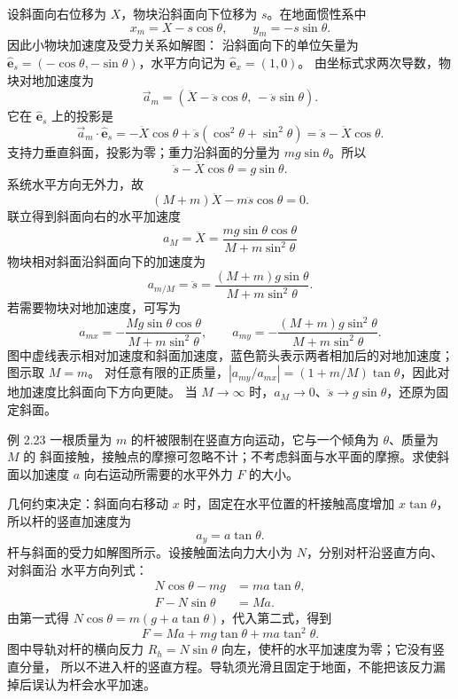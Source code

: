 \begin{xesolution}
设斜面向右位移为 $X$，物块沿斜面向下位移为 $s$。在地面惯性系中
\[
 x_m=X-s\cos\theta,
 \qquad
 y_m=-s\sin\theta.
\]
因此小物块加速度及受力关系如解图：
\soldiagTwoTwentyTwo
沿斜面向下的单位矢量为 $\hat{\boldsymbol e}_s=(-\cos\theta,-\sin\theta)$，水平方向记为 $\hat{\boldsymbol e}_x=(1,0)$。
由坐标式求两次导数，物块对地加速度为
\[
 \vec a_m=(\ddot X-\ddot s\cos\theta,\,-\ddot s\sin\theta).
\]
它在 $\hat{\boldsymbol e}_s$ 上的投影是
\[
 \vec a_m\cdot\hat{\boldsymbol e}_s
 =-\ddot X\cos\theta+\ddot s(\cos^2\theta+\sin^2\theta)
 =\ddot s-\ddot X\cos\theta.
\]
支持力垂直斜面，投影为零；重力沿斜面的分量为 $mg\sin\theta$。所以
\[
 \ddot s-\ddot X\cos\theta=g\sin\theta.
\]
系统水平方向无外力，故
\[
 (M+m)\ddot X-m\ddot s\cos\theta=0.
\]
联立得到斜面向右的水平加速度
\[
 \boxed{a_M=\ddot X
 =\frac{mg\sin\theta\cos\theta}
 {M+m\sin^2\theta}}
\]
物块相对斜面沿斜面向下的加速度为
\[
 \boxed{a_{m/M}=\ddot s
 =\frac{(M+m)g\sin\theta}
 {M+m\sin^2\theta}}.
\]
若需要物块对地加速度，可写为
\[
\boxed{a_{mx}=-\frac{Mg\sin\theta\cos\theta}{M+m\sin^2\theta},
 \qquad
 a_{my}=-\frac{(M+m)g\sin^2\theta}{M+m\sin^2\theta}}.
\]
图中虚线表示相对加速度和斜面加速度，蓝色箭头表示两者相加后的对地加速度；图示取 $M=m$。
对任意有限的正质量，$|a_{my}/a_{mx}|=(1+m/M)\tan\theta$，因此对地加速度比斜面向下方向更陡。
当 $M\to\infty$ 时，$a_M\to0$、$\ddot s\to g\sin\theta$，还原为固定斜面。
\end{xesolution}

\begin{origexamplebox}{例 2.23}
一根质量为 $m$ 的杆被限制在竖直方向运动，它与一个倾角为 $\theta$、质量为 $M$ 的
斜面接触，接触点的摩擦可忽略不计；不考虑斜面与水平面的摩擦。求使斜面以加速度 $a$
向右运动所需要的水平外力 $F$ 的大小。
\probdiagTwoTwentyThree
\end{origexamplebox}

\begin{xesolution}
几何约束决定：斜面向右移动 $x$ 时，固定在水平位置的杆接触高度增加 $x\tan\theta$，
所以杆的竖直加速度为
\[
 a_y=a\tan\theta.
\]
杆与斜面的受力如解图所示。设接触面法向力大小为 $N$，分别对杆沿竖直方向、对斜面沿
水平方向列式：
\soldiagTwoTwentyThree
\begin{align*}
 N\cos\theta-mg&=ma\tan\theta,\\
 F-N\sin\theta&=Ma.
\end{align*}
由第一式得 $N\cos\theta=m(g+a\tan\theta)$，代入第二式，得到
\[
 \boxed{F=Ma+mg\tan\theta+ma\tan^2\theta}.
\]
图中导轨对杆的横向反力 $R_h=N\sin\theta$ 向左，使杆的水平加速度为零；它没有竖直分量，
所以不进入杆的竖直方程。导轨须光滑且固定于地面，不能把该反力漏掉后误认为杆会水平加速。
\end{xesolution}
